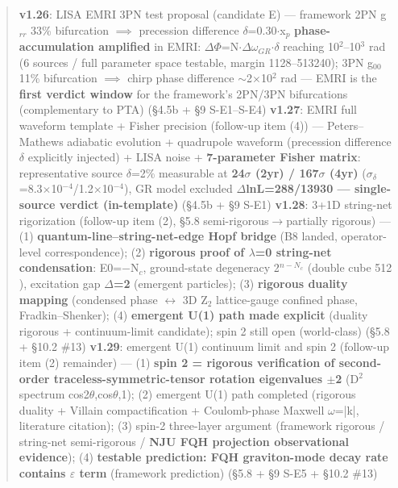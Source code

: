 \documentclass[12pt]{article}
\newcommand{\up}[1]{\ensuremath{^{#1}}}
\newcommand{\down}[1]{\ensuremath{_{#1}}}
\begin{document}
\begin{quote}
\textbf{v1.26}: LISA EMRI 3PN test proposal (candidate E) --- framework 2PN g\down{rr} 33\% bifurcation \ensuremath{\implies} precession difference \ensuremath{\delta}=0.30\ensuremath{\cdot}x\down{p} \textbf{phase-accumulation amplified} in EMRI: \ensuremath{\Delta}\ensuremath{\Phi}=N\ensuremath{\cdot}\ensuremath{\Delta}\ensuremath{\omega}\down{GR}\ensuremath{\cdot}\ensuremath{\delta} reaching 10\up{2}--10\up{3} rad (6 sources / full parameter space testable, margin 1128--513240); 3PN g\down{00} 11\% bifurcation \ensuremath{\implies} chirp phase difference \ensuremath{\sim}2\ensuremath{\times}10\up{2} rad --- EMRI is the \textbf{first verdict window} for the framework's 2PN/3PN bifurcations (complementary to PTA) (\S{}4.5b + \S{}9 S-E1--S-E4)
\textbf{v1.27}: EMRI full waveform template + Fisher precision (follow-up item (4)) --- Peters--Mathews adiabatic evolution + quadrupole waveform (precession difference \ensuremath{\delta} explicitly injected) + LISA noise + \textbf{7-parameter Fisher matrix}: representative source \ensuremath{\delta}=2\% measurable at \textbf{24\ensuremath{\sigma} (2yr) / 167\ensuremath{\sigma} (4yr)} (\ensuremath{\sigma}\down{\delta{}}=8.3\ensuremath{\times}10\up{-4}/1.2\ensuremath{\times}10\up{-4}), GR model excluded \textbf{\ensuremath{\Delta}lnL=288/13930 --- single-source verdict (in-template)} (\S{}4.5b + \S{}9 S-E1)
\textbf{v1.28}: 3+1D string-net rigorization (follow-up item (2), \S{}5.8 semi-rigorous\ensuremath{\to}partially rigorous) --- (1) \textbf{quantum-line--string-net-edge Hopf bridge} (B8 landed, operator-level correspondence); (2) \textbf{rigorous proof of \ensuremath{\lambda}=0 string-net condensation}: E0=\ensuremath{-}N\down{c}, ground-state degeneracy 2\up{n-N\down{c}} (double cube 512 \checkmark), excitation gap \textbf{\ensuremath{\Delta}=2} (emergent particles); (3) \textbf{rigorous duality mapping} (condensed phase \ensuremath{\leftrightarrow} 3D Z\down{2} lattice-gauge confined phase, Fradkin--Shenker); (4) \textbf{emergent U(1) path made explicit} (duality rigorous + continuum-limit candidate); spin 2 still open (world-class) (\S{}5.8 + \S{}10.2 \#13)
\textbf{v1.29}: emergent U(1) continuum limit and spin 2 (follow-up item (2) remainder) --- (1) \textbf{spin 2 = rigorous verification of second-order traceless-symmetric-tensor rotation eigenvalues \ensuremath{\pm}2} (D\up{2} spectrum {cos2\ensuremath{\theta},cos\ensuremath{\theta},1}); (2) emergent U(1) path completed (rigorous duality + Villain compactification + Coulomb-phase Maxwell \ensuremath{\omega}=|k|, literature citation); (3) spin-2 three-layer argument (framework rigorous / string-net semi-rigorous / \textbf{NJU FQH projection observational evidence}); (4) \textbf{testable prediction: FQH graviton-mode decay rate contains \ensuremath{\varepsilon} term} (framework prediction) (\S{}5.8 + \S{}9 S-E5 + \S{}10.2 \#13)

\end{quote}
\end{document}
